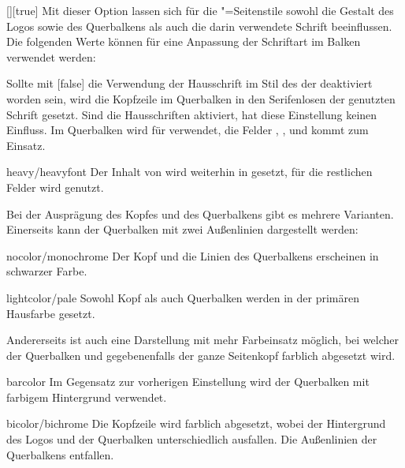 \begin{Declaration*}{}
\begin{Declaration*}{}
\begin{Declaration*}{}
\begin{Declaration}{[\PSet]}[true]
\printdeclarationlist%
%
%
%
Mit dieser Option lassen sich für die "=Seitenstile 
sowohl die Gestalt des Logos sowie des Querbalkens als auch die darin 
verwendete Schrift beeinflussen. Die folgenden Werte können für eine Anpassung 
der Schriftart im Balken verwendet werden:
%
\begin{values}
\itemfalse
  Sollte mit [false] die Verwendung der Hausschrift im Stil des 
  \CDs der \TnUD deaktiviert worden sein, wird die Kopfzeile im Querbalken in
  den Serifenlosen der genutzten Schrift gesetzt. Sind die Hausschriften 
  aktiviert, hat diese Einstellung keinen Einfluss.
  Im Querbalken wird für   verwendet, 
  die Felder , ,  und 
   kommt  zum Einsatz.
\item[heavy/heavyfont]
  Der Inhalt von  wird weiterhin in  
  gesetzt, für die restlichen Felder wird  genutzt.
\end{values}
%
Bei der Ausprägung des Kopfes und des Querbalkens gibt es mehrere Varianten. 
Einerseits kann der Querbalken mit zwei Außenlinien dargestellt werden:
%
\begin{values}
\item[nocolor/monochrome]
  Der Kopf und die Linien des Querbalkens erscheinen in schwarzer Farbe.
\item[lightcolor/pale]
  Sowohl Kopf als auch Querbalken werden in der primären Hausfarbe gesetzt.
\end{values}
%
Andererseits ist auch eine Darstellung mit mehr Farbeinsatz möglich, bei 
welcher der Querbalken und gegebenenfalls der ganze Seitenkopf farblich 
abgesetzt wird.
%
\begin{values}
\item[barcolor]
   Im Gegensatz zur vorherigen Einstellung wird der 
  Querbalken mit farbigem Hintergrund verwendet.
\item[bicolor/bichrome]
   Die Kopfzeile wird farblich abgesetzt, wobei der 
  Hintergrund des Logos und der Querbalken unterschiedlich ausfallen. Die 
  Außenlinien der Querbalkens entfallen.
\end{values}

\end{Declaration}
\end{Declaration*}
\end{Declaration*}
\end{Declaration*}
